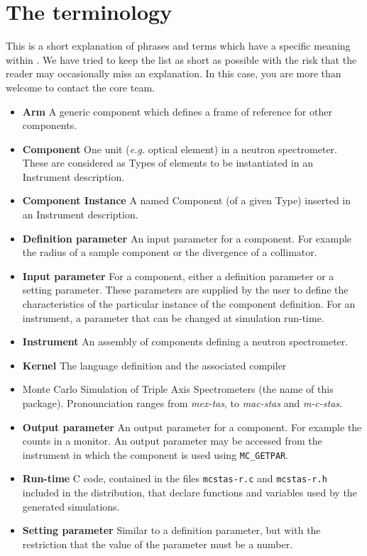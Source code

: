 
\chapter{The \MCS terminology}
\label{s:terminology}

This is a short explanation of phrases and terms which have a specific
meaning within \MCS. We have tried to keep the list as short
as possible with the risk that the reader may occasionally miss
an explanation. In this case, you are more than welcome to contact
the \MCS core team.

\noindent
\begin{itemize}
\item{\bf Arm}  A generic \MCS component which defines a frame of reference
      for other components.
\item{\bf Component} One unit ({\em e.g.} optical element) in a neutron
      spectrometer. These are considered as Types of elements to be instantiated in an Instrument description.
\item{\bf Component Instance} A named Component (of a given Type) inserted in an Instrument description.
\item{\bf Definition parameter} An input parameter for a component. For
  example the radius of a sample component or the divergence of a collimator.
\item{\bf Input parameter} For a component, either a definition parameter
or a setting parameter. These parameters are supplied by the user to
define the characteristics of the particular instance of the component
definition. For an instrument, a parameter that can be changed at
simulation run-time.
\item{\bf Instrument} An assembly of \MCS components defining
      a neutron spectrometer.
\item{\bf Kernel} The \MCS language definition and the associated compiler
\item{\bf \MCS} Monte Carlo Simulation of Triple Axis Spectrometers
       (the name of this package). Pronounciation ranges from \emph{mex-tas}, to \emph{mac-stas} and \emph{m-c-stas}.
\item{\bf Output parameter} An output parameter for a component.
  For example the counts in a monitor. An output parameter may be
  accessed from the instrument in which the component is used using
  \verb`MC_GETPAR`.
\item{\bf Run-time} C code, contained in the files
  \verb+mcstas-r.c+ and \verb+mcstas-r.h+ included in the \MCS
  distribution, that declare functions and variables used by the
  generated simulations.
\item{\bf Setting parameter} Similar to a definition parameter, but with the
  restriction that the value of the parameter must be a number.
\end{itemize}
